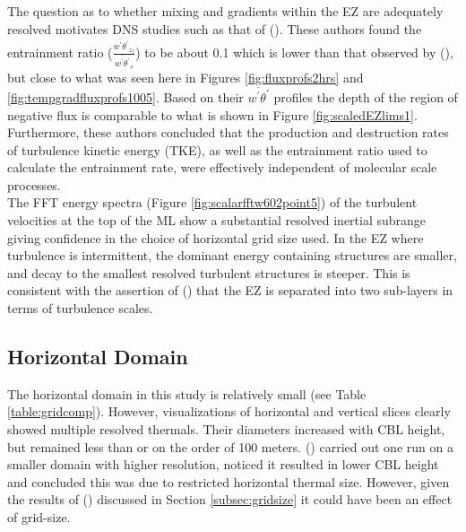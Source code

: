 The question as to whether mixing and gradients within the \acs{EZ} are adequately resolved motivates \acs{DNS}  studies such as that of \citeauthor{GarciaMellado} (\citeyear{GarciaMellado}). These authors found the entrainment ratio ($\frac{\overline{w^{'}\theta^{'}}_{z_{f}}}{\overline{w^{'}\theta^{'}}_{s}}$) to be about 0.1 which is lower than that observed by \citeauthor{FedConzMir04} (\citeyear{FedConzMir04}), but close to what was seen here in Figures \ref{fig:fluxprofs2hrs} and \ref{fig:tempgradfluxprofs1005}.  Based on their $\overline{w^{'}\theta^{'}}$ profiles the depth of the region of negative flux is comparable to what is shown in Figure \ref{fig:scaledEZlims1}.  Furthermore, these authors concluded that the production and destruction rates of turbulence kinetic energy (\acs{TKE}), as well as the entrainment ratio used to calculate the entrainment rate, were effectively independent of molecular scale processes.\\  
  
The \acs{FFT} energy spectra (Figure \ref{fig:scalarfftw602point5}) of the turbulent velocities at the top of the \acs{ML} show a substantial resolved inertial subrange giving confidence in the choice of horizontal grid size used. In the \acs{EZ} where turbulence is intermittent, the dominant energy containing structures are smaller, and decay to the smallest resolved turbulent structures is steeper. This is consistent with the assertion of \citeauthor{GarciaMellado} (\citeyear{GarciaMellado}) that the \acs{EZ} is separated into two sub-layers in terms of turbulence scales.\\

\subsection{Horizontal Domain}

The horizontal domain in this study is relatively small (see Table \ref{table:gridcomp}). However, visualizations of horizontal and vertical slices clearly showed multiple resolved thermals.  Their diameters increased with \acs{CBL} height, but remained less than or on the order of 100 meters.  \citeauthor{SullMoengStev} (\citeyear{SullMoengStev}) carried out one run on a smaller domain with higher resolution, noticed it resulted in lower \acs{CBL} height and concluded this was due to restricted horizontal thermal size. However, given the results of \citeauthor{SullPat} (\citeyear{SullPat}) discussed in Section \ref{subsec:gridsize} it could have been an effect of grid-size.\\   

